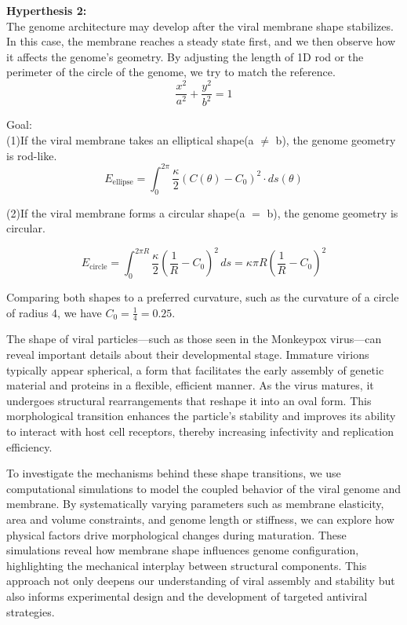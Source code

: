 \documentclass[12pt]{article}
\begin{document}
\begin{flushleft}
	
\noindent \textbf{Hyperthesis 2:}\\
The genome architecture may develop after the viral membrane shape stabilizes. In this case, the membrane reaches a steady state first, and we then observe how it affects the genome’s geometry. By adjusting the length of 1D rod or the perimeter of the circle of the genome, we try to match the reference.\cite{goldsmith2003monkeypox}\\
 
\begin{equation}
\frac{x^2}{a^2} + \frac{y^2}{b^2} = 1
\end{equation}

\noindent Goal:\\
	(1)If the viral membrane takes an elliptical shape(a $\neq$ b), the genome geometry is rod-like\cite{harish2021entomopathogenic}.	\\
	\begin{equation}
E_{\text{ellipse}} = \int_0^{2\pi} \frac{\kappa}{2} \left( C(\theta) - C_0 \right)^2 \cdot ds(\theta)
\end{equation}
	
	
	
	(2)If the viral membrane forms a circular shape(a $=$ b), the genome geometry is circular.
	
\begin{equation}
E_{\text{circle}} = \int_0^{2\pi R} \frac{\kappa}{2} \left( \frac{1}{R} - C_0 \right)^2 \, ds = \kappa \pi R \left( \frac{1}{R} - C_0 \right)^2
\end{equation}

	
Comparing both shapes to a preferred curvature, such as the curvature of a circle of radius 4, we have
\( C_0 = \frac{1}{4} = 0.25 \).
 
	
The shape of viral particles—such as those seen in the Monkeypox virus—can reveal important details about their developmental stage. Immature virions typically appear spherical, a form that facilitates the early assembly of genetic material and proteins in a flexible, efficient manner. As the virus matures, it undergoes structural rearrangements that reshape it into an oval form. This morphological transition enhances the particle’s stability and improves its ability to interact with host cell receptors, thereby increasing infectivity and replication efficiency.

To investigate the mechanisms behind these shape transitions, we use computational simulations to model the coupled behavior of the viral genome and membrane. By systematically varying parameters such as membrane elasticity, area and volume constraints, and genome length or stiffness, we can explore how physical factors drive morphological changes during maturation. These simulations reveal how membrane shape influences genome configuration, highlighting the mechanical interplay between structural components. This approach not only deepens our understanding of viral assembly and stability but also informs experimental design and the development of targeted antiviral strategies.
	


\end{flushleft}
\end{document}
